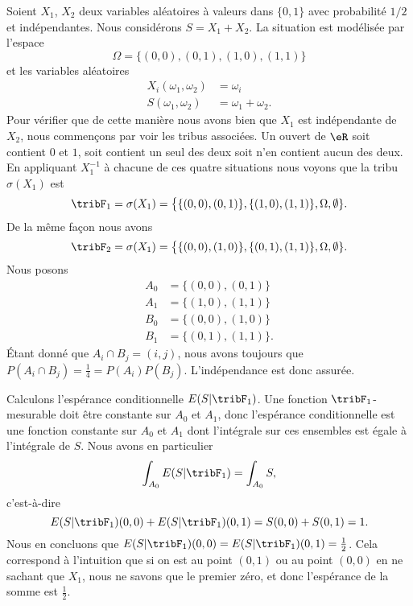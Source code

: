 \begin{example}
	Soient \( X_1\), \( X_2\) deux variables aléatoires à valeurs dans \( \{ 0,1 \}\) avec probabilité \( 1/2\) et indépendantes. Nous considérons \( S=X_1+X_2\). La situation est modélisée par l'espace
	\begin{equation}
		\Omega=\{ (0,0),(0,1),(1,0),(1,1) \}
	\end{equation}
	et les variables aléatoires
	\begin{subequations}
		\begin{align}
			X_i(\omega_1,\omega_2) & =\omega_{i}         \\
			S(\omega_1,\omega_2)   & =\omega_1+\omega_2.
		\end{align}
	\end{subequations}
	Pour vérifier que de cette manière nous avons bien que \( X_1\) est indépendante de \( X_2\), nous commençons par voir les tribus associées. Un ouvert de \( \eR\) soit contient \( 0\) et \( 1\), soit contient un seul des deux soit n'en contient aucun des deux. En appliquant \( X_1^{-1}\) à chacune de ces quatre situations nous voyons que la tribu \( \sigma(X_1)\) est
	\begin{equation}
		\tribF_1=\sigma(X_1)=\big\{ \{ (0,0),(0,1) \},\{ (1,0),(1,1) \},\Omega,\emptyset \}.
	\end{equation}
	De la même façon nous avons
	\begin{equation}
		\tribF_2=\sigma(X_1)=\big\{ \{ (0,0),(1,0) \},\{ (0,1),(1,1) \},\Omega,\emptyset \}.
	\end{equation}
	Nous posons
	\begin{subequations}
		\begin{align}
			A_0 & =\{ (0,0),(0,1) \}  \\
			A_1 & =\{ (1,0),(1,1) \}  \\
			B_0 & =\{ (0,0),(1,0) \}  \\
			B_1 & =\{ (0,1),(1,1) \}.
		\end{align}
	\end{subequations}
	Étant donné que \( A_i\cap B_j=(i,j)\), nous avons toujours que \( P(A_i\cap B_j)=\frac{1}{ 4 }=P(A_i)P(B_j)\). L'indépendance est donc assurée.

	Calculons l'espérance conditionnelle \( E(S|\tribF_1)\). Une fonction \( \tribF_1\)-mesurable doit être constante sur \( A_0\) et \( A_1\), donc l'espérance conditionnelle est une fonction constante sur \( A_0\) et \( A_1\) dont l'intégrale sur ces ensembles est égale à l'intégrale de \( S\). Nous avons en particulier
	\begin{equation}
		\int_{A_0}E(S|\tribF_1)=\int_{A_0}S,
	\end{equation}
	c'est-à-dire
	\begin{equation}
		E(S|\tribF_1)(0,0)+E(S|\tribF_1)(0,1)=S(0,0)+S(0,1)=1.
	\end{equation}
	Nous en concluons que \( E(S|\tribF_1)(0,0)=E(S|\tribF_1)(0,1)=\frac{ 1 }{2}\). Cela correspond à l'intuition que si on est au point \( (0,1)\) ou au point \( (0,0)\) en ne sachant que \( X_1\), nous ne savons que le premier zéro, et donc l'espérance de la somme est \( \frac{ 1 }{2}\).


\end{example}
